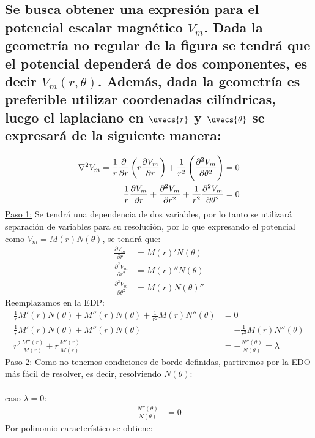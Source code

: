 \documentclass[
  11pt,
  letterpaper,
   answers
  ]{exam}
\begin{document}
\begin{questions}
\begin{solution}
\begin{parts}
    \part{Se busca obtener una expresión para el potencial escalar magnético $V_{m}$. Dada la geometría no regular de la figura se tendrá que el potencial dependerá de dos componentes, es decir $V_{m}(r,\theta)$. Además, dada la geometría es preferible utilizar coordenadas cilíndricas, luego el laplaciano en $\uvecs{r}$ y $\uvecs{\theta}$ se expresará de la siguiente manera:}
    \begin{align}
        \nabla^{2}V_{m} =  \frac{1}{r}\frac{\partial}{\partial r} \del{ r \frac{\partial V_{m}}{\partial r}} + \frac{1}{r^{2}}\del{\frac{\partial^{2}V_{m}}{\partial\theta^{2}}} &= 0\\
        \frac{1}{r} \frac{\partial V_{m}}{\partial r} + \frac{\partial^{2}V_{m}}{\partial r^2} + \frac{1}{r^{2}}\frac{\partial^{2}V_{m}}{\partial \theta^{2}}&=0
    \end{align}
    \underline{Paso 1:}
    Se tendrá una dependencia de dos variables, por lo tanto se utilizará separación de variables para su resolución, por lo que  expresando el potencial como $V_{m} = M(r)N(\theta)$, se tendrá que:
    \begin{align}
        \frac{\partial V_{m}}{ \partial r} &= M(r)'N(\theta)\\
        \frac{\partial^{2} V_{m}}{\partial r^2} &= M(r)''N(\theta)\\
        \frac{\partial^{2}V_{m}}{\partial\theta ^2} &= M(r)N(\theta)''
    \end{align}
    Reemplazamos en la EDP:
    \begin{align}
        \frac{1}{r}M'(r)N(\theta) + M''(r)N(\theta)+\frac{1}{r^2}M(r)N''(\theta) &= 0 \\
        \frac{1}{r}M'(r)N(\theta) + M''(r)N(\theta) &= -\frac{1}{r^2}M(r)N''(\theta) \\
        r^2\frac{M''(r)}{M(r)} + r\frac{M'(r)}{M(r)} &= -\frac{N''(\theta)}{N(\theta)} = \lambda
    \end{align}
    \underline{Paso 2:} Como no tenemos condiciones de borde definidas, partiremos por la EDO más fácil de resolver, es decir, resolviendo $N(\theta)$:
    \\
    \\
    \underline{caso $\lambda = 0$:}
    \begin{align}
        \frac{N''(\theta)}{N(\theta)} &= 0
    \end{align}
    Por polinomio característico se obtiene:

\end{parts}
\end{solution}
\end{questions}
\end{document}
